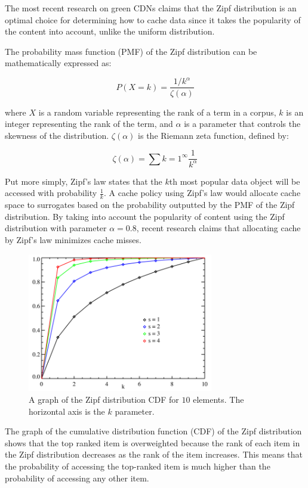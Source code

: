 \documentclass[
	a4paper, %
	10pt, %
	unnumberedsections, %
	twoside, %
]{LTJournalArticle}
\begin{document}
The most recent research on green CDNs claims that the Zipf distribution is an optimal choice for determining how to cache data since it takes the popularity of the content into account, unlike the uniform distribution.

The probability mass function (PMF) of the Zipf distribution can be mathematically expressed as:

\[
	P(X=k) = \frac{1/k^{\alpha}}{\zeta(\alpha)}
\] 

where $X$ is a random variable representing the rank of a term in a corpus, $k$ is an integer representing the rank of the term, and $\alpha$ is a parameter that controls the skewness of the distribution. $\zeta(\alpha)$ is the Riemann zeta function, defined by:

\[
	\zeta(\alpha) = \sum{k=1}^{\infty} \frac{1}{k^{\alpha}} 
\] 

Put more simply, Zipf's law states that the $k$th most popular data object will be accessed with probability $\frac{1}{k}$. A cache policy using Zipf's law would allocate cache space to surrogates based on the probability outputted by the PMF of the Zipf distribution. By taking into account the popularity of content using the Zipf distribution with parameter $\alpha = 0.8$, recent research claims that allocating cache by Zipf's law minimizes cache misses. 

\begin{figure}[h]
	\begin{center}
		\includegraphics[width=8.1cm]{zipf.png}
	\end{center}
	\caption{A graph of the Zipf distribution CDF for $10$ elements. The horizontal axis is the $k$ parameter.}	
\end{figure}

The graph of the cumulative distribution function (CDF) of the Zipf distribution shows that the top ranked item is overweighted because the rank of each item in the Zipf distribution decreases as the rank of the item increases. This means that the probability of accessing the top-ranked item is much higher than the probability of accessing any other item. 
\end{document}
